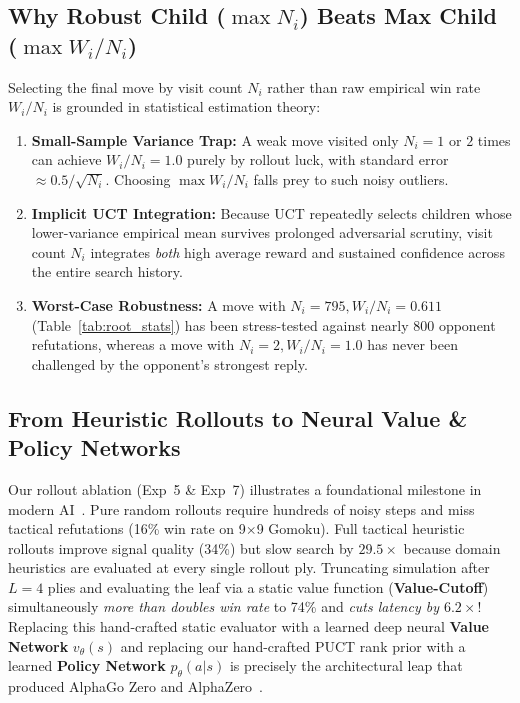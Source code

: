 \documentclass[conference]{IEEEtran}
\begin{document}
\subsection{Why Robust Child ($\max N_i$) Beats Max Child ($\max W_i/N_i$)}
Selecting the final move by visit count $N_i$ rather than raw empirical win rate $W_i/N_i$ is grounded in statistical estimation theory:
\begin{enumerate}
    \item \textbf{Small-Sample Variance Trap:} A weak move visited only $N_i=1$ or $2$ times can achieve $W_i/N_i = 1.0$ purely by rollout luck, with standard error $\approx 0.5 / \sqrt{N_i}$. Choosing $\max W_i/N_i$ falls prey to such noisy outliers.
    \item \textbf{Implicit UCT Integration:} Because UCT repeatedly selects children whose lower-variance empirical mean survives prolonged adversarial scrutiny, visit count $N_i$ integrates \emph{both} high average reward and sustained confidence across the entire search history.
    \item \textbf{Worst-Case Robustness:} A move with $N_i = 795, W_i/N_i = 0.611$ (Table~\ref{tab:root_stats}) has been stress-tested against nearly 800 opponent refutations, whereas a move with $N_i = 2, W_i/N_i = 1.0$ has never been challenged by the opponent's strongest reply.
\end{enumerate}

\subsection{From Heuristic Rollouts to Neural Value \& Policy Networks}
Our rollout ablation (Exp~5 & Exp~7) illustrates a foundational milestone in modern AI~\cite{silver2016,silver2017}. Pure random rollouts require hundreds of noisy steps and miss tactical refutations (16\% win rate on 9$\times$9 Gomoku). Full tactical heuristic rollouts improve signal quality (34\%) but slow search by $29.5\times$ because domain heuristics are evaluated at every single rollout ply. Truncating simulation after $L=4$ plies and evaluating the leaf via a static value function (\textbf{Value-Cutoff}) simultaneously \emph{more than doubles win rate} to 74\% and \emph{cuts latency by $6.2\times$}! Replacing this hand-crafted static evaluator with a learned deep neural \textbf{Value Network} $v_\theta(s)$ and replacing our hand-crafted PUCT rank prior with a learned \textbf{Policy Network} $p_\theta(a|s)$ is precisely the architectural leap that produced AlphaGo Zero and AlphaZero~\cite{silver2017}.
\end{document}
